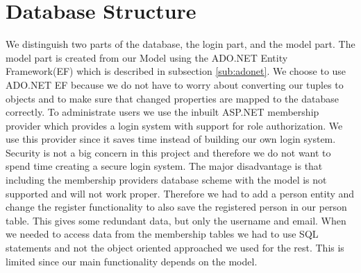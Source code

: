 \section{Database Structure}
\label{sec:databasestructure}

We distinguish two parts of the database, the login part, and the model part. 
The model part is created from our Model  using the ADO.NET Entity Framework(EF) which is described in subsection \ref{sub:adonet}. 
We choose to use ADO.NET EF because we do not have to worry about converting our tuples to objects and to make sure that changed properties are mapped to the database correctly.  
To administrate users we use the inbuilt ASP.NET membership provider which provides a login system with support for role authorization. 
We use this provider since it saves time instead of building our own login system. 
Security is not a big concern in this project and therefore we do not want to spend time creating a secure login system. 
The major disadvantage is that including the membership providers database scheme with the model is not supported and will not work proper. 
Therefore we had to add a person entity and change the register functionality to also save the registered person in our person table. 
This gives some redundant data, but only the username and email. 
When we needed to access data from the membership tables we had to use SQL statements and not the object oriented approached we used for the rest. 
This is limited since our main functionality depends on the model. 


